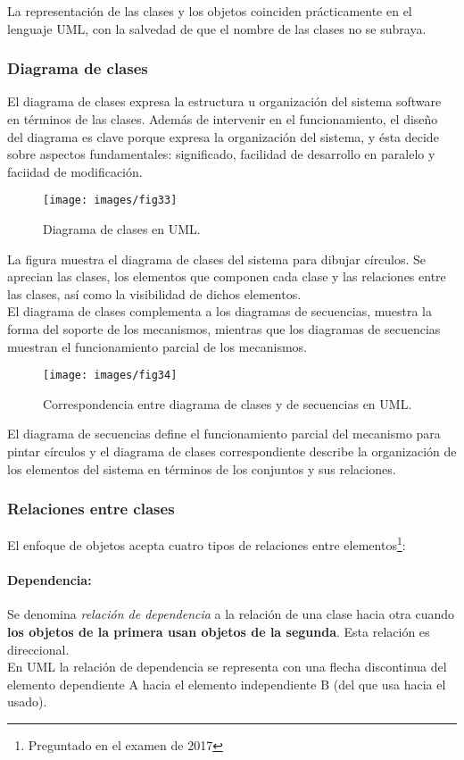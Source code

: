 La representación de las clases y los objetos coinciden prácticamente
en el lenguaje UML, con la salvedad de que el nombre de las clases no
se subraya.

\subsubsection{Diagrama de clases}
El diagrama de clases expresa la estructura u organización del sistema
software en términos de las clases. Además de intervenir en el
funcionamiento, el diseño del diagrama es clave porque expresa la
organización del sistema, y ésta decide sobre aspectos fundamentales:
significado, facilidad de desarrollo en paralelo y faciidad de modificación.

\begin{figure}[ht!]  \centering
  \texttt{[image: images/fig33]}
  \caption{Diagrama de clases en UML.}
  \label{fig:33}
\end{figure}

La figura muestra el diagrama de clases del sistema para dibujar
círculos. Se aprecian las clases, los elementos que componen cada
clase y las relaciones entre las clases, así como la visibilidad de
dichos elementos.\\
El diagrama de clases complementa a los diagramas de secuencias,
muestra la forma del soporte de los mecanismos, mientras que los
diagramas de secuencias muestran el funcionamiento parcial de los
mecanismos.
\begin{figure}[ht!]  \centering
  \texttt{[image: images/fig34]}
  \caption{Correspondencia entre diagrama de clases y de secuencias en UML.}
  \label{fig:34}
\end{figure}

El diagrama de secuencias define el funcionamiento parcial del
mecanismo para pintar círculos y el diagrama de clases correspondiente
describe la organización de los elementos del sistema en términos de
los conjuntos y sus relaciones.

\subsubsection{Relaciones entre clases}
El enfoque de objetos acepta cuatro tipos de relaciones entre
elementos\footnote{Preguntado en el examen de 2017}:
\paragraph{Dependencia:}
Se denomina \emph{relación de dependencia} a la relación de una clase
hacia otra cuando \textbf{los objetos de la primera usan objetos de la
  segunda}. Esta relación es direccional. \\
En UML la relación de dependencia se representa con una flecha
discontinua del elemento dependiente A hacia el elemento independiente
B (del que usa hacia el usado).
